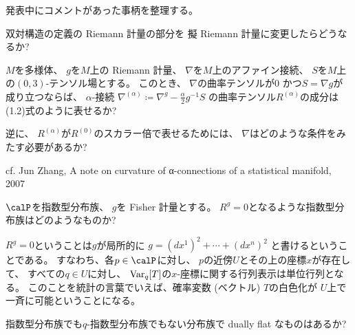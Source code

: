 \documentclass[report]{jlreq}
\begin{document}
%

発表中にコメントがあった事柄を整理する。

\begin{problem}
    双対構造の定義の
    Riemann 計量の部分を
    擬 Riemann 計量に変更したらどうなるか?
\end{problem}

\begin{answer}
    \TODO{}
\end{answer}

\begin{problem}
    $M$を多様体、
    $g$を$M$上の Riemann 計量、
    $\nabla$を$M$上のアファイン接続、
    $S$を$M$上の$(0, 3)$-テンソル場とする。
    このとき、
    $\nabla$の曲率テンソルが$0$
    かつ$S = \nabla g$が成り立つならば、
    $\alpha$-接続
    $\nabla^{(\alpha)} \coloneqq \nabla^g - \frac{\alpha}{2} g^{-1}S$
    の曲率テンソル$R^{(\alpha)}$の成分は
    (1.2)式のように表せるか?

    逆に、
    $R^{(\alpha)}$が$R^{(0)}$のスカラー倍で表せるためには、
    $\nabla$はどのような条件をみたす必要があるか?
\end{problem}

\begin{answer}
    cf. Jun Zhang, A note on curvature of α-connections of a statistical manifold, 2007

    \TODO{}
\end{answer}

\begin{problem}
    $\calP$を指数型分布族、
    $g$を Fisher 計量とする。
    $R^g = 0$となるような指数型分布族はどのようなものか?
\end{problem}

\begin{answer}
    $R^g = 0$ということは$g$が局所的に
    $g = (dx^1)^2 + \cdots + (dx^n)^2$
    と書けるということである。
    すなわち、各$p \in \calP$に対し、
    $p$の近傍$U$とその上の座標$x$が存在して、
    すべての$q \in U$に対し、
    $\operatorname{Var}_q[T]$の$x$-座標に関する行列表示は単位行列となる。
    このことを統計の言葉でいえば、確率変数 (ベクトル) $T$の白色化が
    $U$上で一斉に可能ということになる。
    \TODO{}
\end{answer}

\begin{problem}
    指数型分布族でも$q$-指数型分布族でもない分布族で
    dually flat なものはあるか?
\end{problem}

\begin{definition}[自己平行部分多様体]
    \TODO{}
\end{definition}
\end{document}
